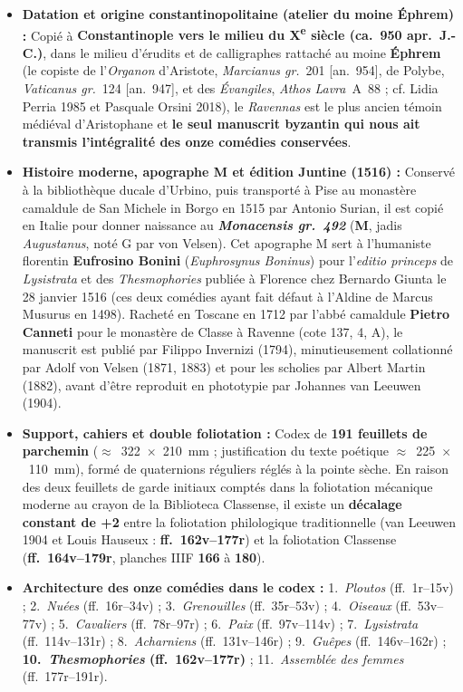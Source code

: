 \documentclass[10pt, a4paper, twoside]{book}
\renewcommand{\_}{\origunderscore\penalty0\relax}
\renewcommand{\texttt}[1]{#1}
\providecommand{\italique}[1]{\emph{#1}}
\providecommand{\ieme}{\textsuperscript{e}}
\providecommand{\Mon}{M}
\begin{document}
\begin{itemize}
  \item \textbf{Datation et origine constantinopolitaine (atelier du moine Éphrem) :} Copié à \textbf{Constantinople vers le milieu du X\ieme{} siècle (ca.~950 apr.~J.-C.)}, dans le milieu d'érudits et de calligraphes rattaché au moine \textbf{Éphrem} (le copiste de l'\italique{Organon} d'Aristote, \italique{Marcianus gr.}~201 [an.~954], de Polybe, \italique{Vaticanus gr.}~124 [an.~947], et des \italique{Évangiles}, \italique{Athos Lavra}~A~88 ; cf. Lidia Perria 1985 et Pasquale Orsini 2018), le \italique{Ravennas} est le plus ancien témoin médiéval d'Aristophane et \textbf{le seul manuscrit byzantin qui nous ait transmis l'intégralité des onze comédies conservées}.
  \item \textbf{Histoire moderne, apographe \Mon{} et édition Juntine (1516) :} Conservé à la bibliothèque ducale d'Urbino, puis transporté à Pise au monastère camaldule de San Michele in Borgo en 1515 par Antonio Surian, il est copié en Italie pour donner naissance au \textbf{\italique{Monacensis gr.~492}} (\textbf{\Mon{}}, jadis \italique{Augustanus}, noté G par von Velsen). Cet apographe \Mon{} sert à l'humaniste florentin \textbf{Eufrosino Bonini} (\italique{Euphrosynus Boninus}) pour l'\italique{editio princeps} de \italique{Lysistrata} et des \italique{Thesmophories} publiée à Florence chez Bernardo Giunta le 28 janvier 1516 (ces deux comédies ayant fait défaut à l'Aldine de Marcus Musurus en 1498). Racheté en Toscane en 1712 par l'abbé camaldule \textbf{Pietro Canneti} pour le monastère de Classe à Ravenne (cote \texttt{137, 4, A}), le manuscrit est publié par Filippo Invernizi (1794), minutieusement collationné par Adolf von Velsen (1871, 1883) et pour les scholies par Albert Martin (1882), avant d'être reproduit en phototypie par Johannes van Leeuwen (1904).
  \item \textbf{Support, cahiers et double foliotation :} Codex de \textbf{191 feuillets de parchemin} ($\approx$~322~$\times$~210~mm ; justification du texte poétique $\approx$~225~$\times$~110~mm), formé de quaternions réguliers réglés à la pointe sèche. En raison des deux feuillets de garde initiaux comptés dans la foliotation mécanique moderne au crayon de la Biblioteca Classense, il existe un \textbf{décalage constant de +2} entre la foliotation philologique traditionnelle (van Leeuwen 1904 et Louis Hauseux : \textbf{\texttt{ff.~162v--177r}}) et la foliotation Classense (\textbf{\texttt{ff.~164v--179r}}, planches IIIF \textbf{\texttt{166}} à \textbf{\texttt{180}}).
  \item \textbf{Architecture des onze comédies dans le codex :} 1.~\italique{Ploutos} (\texttt{ff.~1r--15v}) ; 2.~\italique{Nuées} (\texttt{ff.~16r--34v}) ; 3.~\italique{Grenouilles} (\texttt{ff.~35r--53v}) ; 4.~\italique{Oiseaux} (\texttt{ff.~53v--77v}) ; 5.~\italique{Cavaliers} (\texttt{ff.~78r--97r}) ; 6.~\italique{Paix} (\texttt{ff.~97v--114v}) ; 7.~\italique{Lysistrata} (\texttt{ff.~114v--131r}) ; 8.~\italique{Acharniens} (\texttt{ff.~131v--146r}) ; 9.~\italique{Guêpes} (\texttt{ff.~146v--162r}) ; \textbf{10.~\italique{Thesmophories} (\texttt{ff.~162v--177r})} ; 11.~\italique{Assemblée des femmes} (\texttt{ff.~177r--191r}).
\end{itemize}
\end{document}
